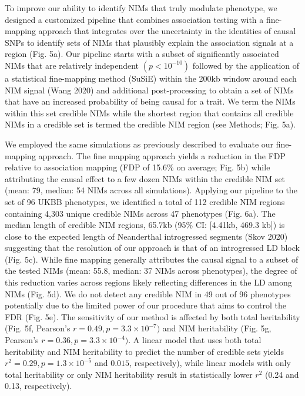 To improve our ability to identify NIMs that truly modulate phenotype, we designed a customized pipeline that combines association testing with a fine-mapping approach that integrates over the uncertainty in the identities of causal SNPs to identify sets of NIMs that plausibly explain the association signals at a region (Fig. 5a). Our pipeline starts with a subset of significantly associated NIMs that are relatively independent $(p < 10^{-10})$ followed by the application of a statistical fine-mapping method (SuSiE) within the 200kb window around each NIM signal (Wang 2020) and additional post-processing to obtain a set of NIMs that have an increased probability of being causal for a trait. We term the NIMs within this set credible NIMs while the shortest region that contains all credible NIMs in a credible set is termed the credible NIM region (see Methods; Fig. 5a). 

We employed the same simulations as previously described to evaluate our fine-mapping approach. The fine mapping approach yields a reduction in the FDP relative to association mapping (FDP of 15.6\% on average; Fig. 5b) while attributing the causal effect to a few dozen NIMs within the credible NIM set (mean: 79, median: 54 NIMs across all simulations). Applying our pipeline to the set of 96 UKBB phenotypes, we identified a total of 112 credible NIM regions containing 4,303 unique credible NIMs across 47 phenotypes (Fig. 6a). The median length of credible NIM regions, 65.7kb (95\% CI: [4.41kb, 469.3 kb]) is close to the expected length of Neanderthal introgressed segments (Skov 2020) suggesting that the resolution of our approach is that of an introgressed LD block (Fig. 5c). While fine mapping generally attributes the causal signal to a subset of the tested NIMs (mean: 55.8, median: 37 NIMs across phenotypes), the degree of this reduction varies across regions likely reflecting differences in the LD among NIMs (Fig. 5d). We do not detect any credible NIM in 49 out of 96 phenotypes potentially due to the limited power of our procedure that aims to control the FDR (Fig. 5e). The sensitivity of our method is affected by both total heritability (Fig. 5f, Pearson’s $r = 0.49 , p = 3.3\times 10^{-7})$  and NIM heritability (Fig. 5g, Pearson’s $r = 0.36, p = 3.3\times10^{-4})$. A linear model that uses both total heritability and NIM heritability to predict the number of credible sets yields $r^2 = 0.29, p = 1.3\times10^{-5}$ and $0.015$, respectively), while linear models with only total heritability or only NIM heritability result in statistically lower $r^2$ (0.24 and 0.13, respectively).

